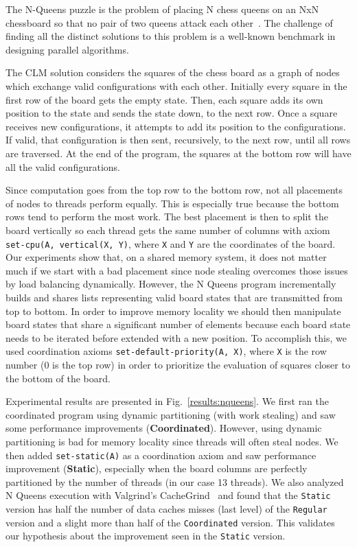 The N-Queens puzzle is the problem of placing N chess queens on an NxN
chessboard so that no pair of two queens attack each
other~\cite{8queens}. The challenge of finding all the
distinct solutions to this problem is a well-known benchmark in designing
parallel algorithms.

The CLM solution considers the squares of the chess board as a graph
of nodes which exchange valid configurations with each
other. Initially every square in the first row of the board gets the
empty state.  Then, each square adds its own position to the state and
sends the state down, to the next row. Once a square receives new
configurations, it attempts to add its position to the
configurations. If valid, that configuration is then sent,
recursively, to the next row, until all rows are traversed. At the end
of the program, the squares at the bottom row will have all the valid
configurations.

Since computation goes from the top row to the bottom row, not all
placements of nodes to threads perform equally. This is especially
true because the bottom rows tend to perform the most work. The best
placement is then to split the board vertically so each thread gets
the same number of columns with axiom \texttt{set-cpu(A, vertical(X, Y)}, where
\texttt{X} and \texttt{Y} are the coordinates of the board. Our experiments show that, on a shared
memory system, it does not matter much if we start with a bad
placement since node stealing overcomes those issues by load balancing
dynamically.  However, the N Queens program incrementally builds and shares lists representing
valid board states that are transmitted from top to bottom.
In order to improve memory locality we should then manipulate board
states that share a significant number of elements because each board state
needs to be iterated before extended with a new position.
To accomplish this, we used coordination axioms \texttt{set-default-priority(A,
X)}, where \texttt{X} is the row number (0 is the top row) in order to
prioritize the evaluation of squares closer to the bottom of the board.

Experimental results are presented in Fig.~\ref{results:nqueens}.  We
first ran the coordinated program using dynamic partitioning (with
work stealing) and saw some performance improvements
(\textbf{Coordinated}). However, using dynamic partitioning is bad for
memory locality since threads will often steal nodes.  We then
added \texttt{set-static(A)} as a coordination axiom and saw
performance improvement (\textbf{Static}), especially when the board
columns are perfectly partitioned by the number of threads (in our
case 13 threads). We also analyzed N Queens execution with Valgrind's
CacheGrind~\cite{Nethercote:2007:VFH:1250734.1250746} and found that the
\texttt{Static} version has half the number of data caches misses (last level)
of the \texttt{Regular} version and a slight more than half of the
\texttt{Coordinated} version. This validates our hypothesis about the
improvement seen in the \texttt{Static} version.

